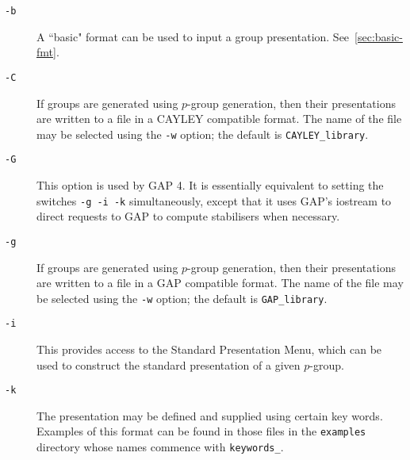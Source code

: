 \documentclass[12pt]{article}
\begin{document}
\enlargethispage*{1\baselineskip}
\begin{description}


\item[\texttt{-b}\hspace*{1em}]
      A ``basic" format can be used to input a group presentation.
      See~\ref{sec:basic-fmt}.

\item[\texttt{-C}\hspace*{1em}]
      If groups are generated using $p$-group generation, then 
      their presentations are written to a file
      in a CAYLEY compatible format.
      The name of the file may be selected using the \texttt{-w} option;
      the default is \texttt{CAYLEY\_library}.

\item[\texttt{-G}\hspace*{1em}]
      This option is used by {\sf GAP} 4. It is essentially equivalent
      to setting the switches \texttt{-g -i -k} simultaneously, except
      that it uses {\sf GAP}'s iostream to direct requests to {\sf GAP}
      to compute stabilisers when necessary.

\item[\texttt{-g}\hspace*{1em}]
      If groups are generated using $p$-group generation, then 
      their presentations are written to a file
      in a {\sf GAP} compatible format.
      The name of the file may be selected using the \texttt{-w} option;
      the default is \texttt{GAP\_library}.

\item[\texttt{-i}\hspace*{1em}]
      This provides access to the Standard Presentation Menu,
      which can be used to construct the standard presentation
      of a given $p$-group.

\item[\texttt{-k}\hspace*{1em}]
      The presentation may be defined and supplied using certain
      key words. Examples of this format can be found in those 
      files in the \texttt{examples} directory whose names commence with 
      \texttt{keywords\_}.


\end{description}
\end{document}

